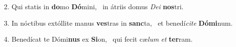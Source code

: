 2. Qui statis in \textbf{do}mo \textbf{Dó}mini, \ast\  in átriis domus \textit{De}\textit{i} \textbf{nos}tri.\

3. In nóctibus extóllite manus \textbf{ves}tras in \textbf{sanc}ta, \ast\  et benedí\textit{ci}\textit{te} \textbf{Dó}\textbf{mi}num.\

4. Benedícat te Dómi\textbf{nus} ex \textbf{Si}on, \ast\  qui fecit cæ\textit{lum} \textit{et} \textbf{ter}ram.\

